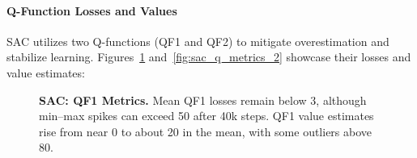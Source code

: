 \paragraph{Q-Function Losses and Values}
SAC utilizes two Q-functions (QF1 and QF2) to mitigate overestimation and stabilize learning. Figures~\ref{fig:sac_q_metrics_1} and~\ref{fig:sac_q_metrics_2} showcase their losses and value estimates:
\begin{figure}
	\centering
	\caption{\textbf{SAC: QF1 Metrics.} Mean QF1 losses remain below 3, although min–max spikes can exceed 50 after 40k steps. QF1 value estimates rise from near 0 to about 20 in the mean, with some outliers above 80.}
	\label{fig:sac_q_metrics_1}
\end{figure}


